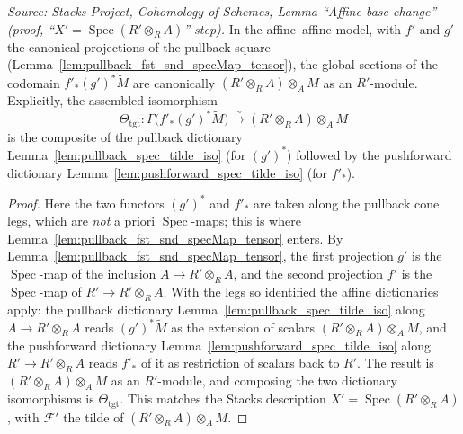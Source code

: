 \begin{lemma}



  \label{lem:base_change_mate_codomain_read}
  \textit{Source: Stacks Project, Cohomology of Schemes, Lemma ``Affine base
  change'' (proof, ``\(X' = \operatorname{Spec}(R' \otimes_R A)\)'' step).}
  In the affine--affine model, with \(f'\) and \(g'\) the canonical projections of the
  pullback square (Lemma~\ref{lem:pullback_fst_snd_specMap_tensor}), the global
  sections of the codomain \(f'_*(g')^*\widetilde M\) are canonically
  \((R' \otimes_R A) \otimes_A M\) as an \(R'\)-module. Explicitly, the assembled
  isomorphism
  \[
    \Theta_{\mathrm{tgt}} :
    \Gamma\bigl(f'_*(g')^*\widetilde M\bigr)
    \xrightarrow{\ \sim\ } (R' \otimes_R A) \otimes_A M
  \]
  is the composite of the pullback dictionary Lemma~\ref{lem:pullback_spec_tilde_iso}
  (for \((g')^*\)) followed by the pushforward dictionary
  Lemma~\ref{lem:pushforward_spec_tilde_iso} (for \(f'_*\)).
\end{lemma}

\begin{proof}
  Here the two functors \((g')^*\) and \(f'_*\) are taken along the pullback cone legs,
  which are \emph{not} a priori \(\operatorname{Spec}\)-maps; this is where
  Lemma~\ref{lem:pullback_fst_snd_specMap_tensor} enters. By
  Lemma~\ref{lem:pullback_fst_snd_specMap_tensor}, the first projection \(g'\) is the
  \(\operatorname{Spec}\)-map of the inclusion \(A \to R' \otimes_R A\), and the second
  projection \(f'\) is the \(\operatorname{Spec}\)-map of \(R' \to R' \otimes_R A\).
  With the legs so identified the affine dictionaries apply:
  the pullback dictionary Lemma~\ref{lem:pullback_spec_tilde_iso} along
  \(A \to R' \otimes_R A\) reads \((g')^*\widetilde M\) as the extension of scalars
  \((R' \otimes_R A) \otimes_A M\), and the pushforward dictionary
  Lemma~\ref{lem:pushforward_spec_tilde_iso} along \(R' \to R' \otimes_R A\) reads
  \(f'_*\) of it as restriction of scalars back to \(R'\). The result is
  \((R' \otimes_R A) \otimes_A M\) as an \(R'\)-module, and composing the two dictionary
  isomorphisms is \(\Theta_{\mathrm{tgt}}\). This matches the Stacks description
  \(X' = \operatorname{Spec}(R' \otimes_R A)\), with \(\mathcal{F}'\) the tilde of
  \((R' \otimes_R A) \otimes_A M\).
\end{proof}


